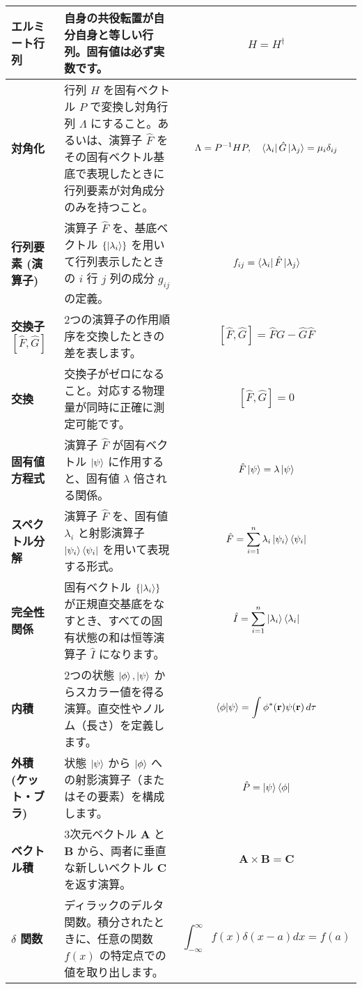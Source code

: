 \documentclass{ltjsarticle}
\begin{document}
\begin{longtable}{| >{\bfseries}l | p{6cm} | p{6cm} |}
\hline
エルミート行列 & 自身の共役転置が自分自身と等しい行列。固有値は必ず実数です。 & $$H = H^\dagger$$ \\
\hline
対角化 & 行列 $H$ を固有ベクトル $P$ で変換し対角行列 $\Lambda$ にすること。あるいは、演算子 $\hat{F}$ をその固有ベクトル基底で表現したときに行列要素が対角成分のみを持つこと。 & $$\Lambda = P^{-1} H P, \quad \bra{\lambda_i}\hat{G}\ket{\lambda_j} = \mu_i \delta_{ij}$$ \\
\hline
行列要素 (演算子) & 演算子 $\hat{F}$ を、基底ベクトル $\{ \ket{\lambda_i} \}$ を用いて行列表示したときの $i$ 行 $j$ 列の成分 $g_{ij}$ の定義。 & $$f_{ij} = \bra{\lambda_i}\hat{F}\ket{\lambda_j}$$ \\
\hline
交換子 $[\hat{F}, \hat{G}]$ & 2つの演算子の作用順序を交換したときの差を表します。 & $$[\hat{F}, \hat{G}] = \hat{F}\hat{G} - \hat{G}\hat{F}$$ \\
\hline
交換 & 交換子がゼロになること。対応する物理量が同時に正確に測定可能です。 & $$[\hat{F}, \hat{G}] = 0$$ \\
\hline
固有値方程式 & 演算子 $\hat{F}$ が固有ベクトル $\ket{\psi}$ に作用すると、固有値 $\lambda$ 倍される関係。 & $$\hat{F} \ket{\psi} = \lambda \ket{\psi}$$ \\
\hline
スペクトル分解 & 演算子 $\hat{F}$ を、固有値 $\lambda_i$ と射影演算子 $\ket{\psi_i}\bra{\psi_i}$ を用いて表現する形式。 & $$\hat{F} = \sum_{i=1}^{n} \lambda_{i} \ket{\psi_{i}}\bra{\psi_{i}}$$ \\
\hline
完全性関係 & 固有ベクトル $\{ \ket{\lambda_i} \}$ が正規直交基底をなすとき、すべての固有状態の和は恒等演算子 $\hat{I}$ になります。 & $$\hat{I} = \sum_{i=1}^{n} \ket{\lambda_i}\bra{\lambda_i}$$ \\
\hline
内積 & 2つの状態 $\ket{\phi}, \ket{\psi}$ からスカラー値を得る演算。直交性やノルム（長さ）を定義します。 & $$\braket{\phi|\psi} = \int \phi^{*}(\mathbf{r}) \psi(\mathbf{r}) \, d\tau$$ \\
\hline
外積 (ケット・ブラ) & 状態 $\ket{\psi}$ から $\ket{\phi}$ への射影演算子（またはその要素）を構成します。 & $$\hat{P} = \ket{\psi}\bra{\phi}$$ \\
\hline
ベクトル積 & 3次元ベクトル $\mathbf{A}$ と $\mathbf{B}$ から、両者に垂直な新しいベクトル $\mathbf{C}$ を返す演算。 & $$\mathbf{A} \times \mathbf{B} = \mathbf{C}$$ \\
\hline
$\delta$ 関数 & ディラックのデルタ関数。積分されたときに、任意の関数 $f(x)$ の特定点での値を取り出します。 & $$\int_{-\infty}^{\infty} f(x) \delta(x-a) dx = f(a)$$ \\
\hline

\end{longtable}
\end{document}
